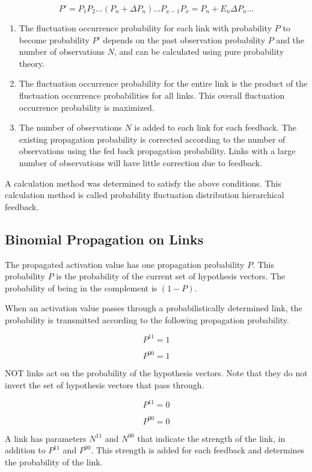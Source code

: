 \documentclass[12pt]{article}
\begin{document}
\[P'=P_1 P_2 ... (P_n+\Delta P_n) ... P_{x-1}P_{x}=P_n+E_n\Delta P_n ...\]

\begin{enumerate}
\def\labelenumi{\arabic{enumi}.}
\setcounter{enumi}{1}
\item
  The fluctuation occurrence probability for each link with probability
  \(P\) to become probability \(P'\) depends on the past observation
  probability \(P\) and the number of observations \(N\), and can be
  calculated using pure probability theory.
\item
  The fluctuation occurrence probability for the entire link is the
  product of the fluctuation occurrence probabilities for all links.
  This overall fluctuation occurrence probability is maximized.
\item
  The number of observations \(N\) is added to each link for each
  feedback. The existing propagation probability is corrected according
  to the number of observations using the fed back propagation
  probability. Links with a large number of observations will have
  little correction due to feedback.
\end{enumerate}

A calculation method was determined to satisfy the above conditions.
This calculation method is called probability fluctuation distribution
hierarchical feedback.

\subsection{Binomial Propagation on
Links}\label{binomial-propagation-on-links}

The propagated activation value has one propagation probability \(P\).
This probability \(P\) is the probability of the current set of
hypothesis vectors. The probability of being in the complement is
\((1-P)\).

When an activation value passes through a probabilistically determined
link, the probability is transmitted according to the following
propagation probability.

\[ P^{11}=1 \]

\[ P^{00}=1 \]

NOT links act on the probability of the hypothesis vectors. Note that
they do not invert the set of hypothesis vectors that pass through.

\[ P^{11}=0 \]

\[ P^{00}=0 \]

A link has parameters \(N^{11}\) and \(N^{00}\) that indicate the
strength of the link, in addition to \(P^{11}\) and \(P^{00}\). This
strength is added for each feedback and determines the probability of
the link.
\end{document}
